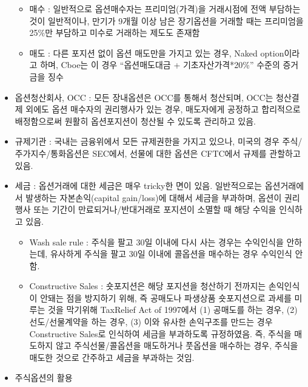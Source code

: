 \documentclass[
  letterpaper,
  DIV=11,
  numbers=noendperiod]{scrreprt}
\providecommand{\tightlist}{%
  \setlength{\itemsep}{0pt}\setlength{\parskip}{0pt}}\usepackage{longtable,booktabs,array}
\begin{document}
\begin{itemize}
  \begin{itemize}
  \tightlist
  \item
    매수 : 일반적으로 옵션매수자는 프리미엄(가격)을 거래시점에 전액
    부담하는 것이 일반적이나, 만기가 9개월 이상 남은 장기옵션을 거래할
    때는 프리미엄을 25\%만 부담하고 미수로 거래하는 제도도 존재함
  \item
    매도 : 다른 포지션 없이 옵션 매도만을 가지고 있는 경우, Naked
    option이라고 하며, Cboe는 이 경우 ``옵션매도대금 +
    기초자산가격*20\%'' 수준의 증거금을 징수
  \end{itemize}
\item
  옵션청산회사, OCC : 모든 장내옵션은 OCC를 통해서 청산되며, OCC는
  청산결제 외에도 옵션 매수자의 권리행사가 있는 경우, 매도자에게
  공정하고 합리적으로 배정함으로써 원활히 옵션포지션이 청산될 수 있도록
  관리하고 있음.
\item
  규제기관 : 국내는 금융위에서 모든 규제권한을 가지고 있으나, 미국의
  경우 주식/주가지수/통화옵션은 SEC에서, 선물에 대한 옵션은 CFTC에서
  규제를 관할하고 있음.
\item
  세금 : 옵션거래에 대한 세금은 매우 tricky한 면이 있음. 일반적으로는
  옵션거래에서 발생하는 자본손익(capital gain/loss)에 대해서 세금을
  부과하며, 옵션이 권리행사 또는 기간이 만료되거나/반대거래로 포지션이
  소멸할 때 해당 수익을 인식하고 있음.

  \begin{itemize}
  \tightlist
  \item
    Wash sale rule : 주식을 팔고 30일 이내에 다시 사는 경우는 수익인식을
    안하는데, 유사하게 주식을 팔고 30일 이내에 콜옵션을 매수하는 경우
    수익인식 안함.
  \item
    Constructive Sales : 숏포지션은 해당 포지션을 청산하기 전까지는
    손익인식이 안돼는 점을 방지하기 위해, 즉 공매도나 파생상품
    숏포지션으로 과세를 미루는 것을 막기위해 TaxRelief Act of 1997에서
    (1) 공매도를 하는 경우, (2) 선도/선물계약을 하는 경우, (3) 이와
    유사한 손익구조를 만드는 경우 Constructive Sales로 인식하여 세금을
    부과하도록 규정하였음. 즉, 주식을 매도하지 않고 주식선물/콜옵션을
    매도하거나 풋옵션을 매수하는 경우, 주식을 매도한 것으로 간주하고
    세금을 부과하는 것임.
  \end{itemize}
\item
  주식옵션의 활용


\end{itemize}
\end{document}
